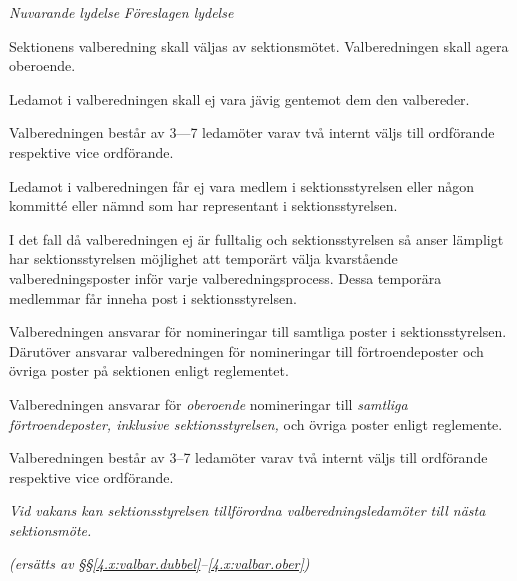\documentclass{article}
\newenvironment{lydelse}
    {\begin{paracol}{2}%
        \emph{Nuvarande lydelse}%
        \switchcolumn%
        \emph{Föreslagen lydelse}%
    \end{paracol}%
    \begin{enumerate}[label=\thesubsection.\arabic*]%
    \begin{paracol}{2}%
    }{\end{paracol}\end{enumerate}}
\begin{document}
\begin{lydelse}
  \setcounter{section}{6}
  \setcounter{subsection}{1}
  \item Sektionens valberedning skall väljas av sektionsmötet. Valberedningen skall agera oberoende.
  \item Ledamot i valberedningen skall ej vara jävig gentemot dem den valbereder.
  \setcounter{subsection}{2}
  \setcounter{enumi}{0}
  \item Valberedningen består av 3---7 ledamöter varav två internt väljs till ordförande respektive vice ordförande.
  \item Ledamot i valberedningen får ej vara medlem i sektionsstyrelsen eller någon kommitté eller nämnd som har representant i sektionsstyrelsen.
  \item I det fall då valberedningen ej är fulltalig och sektionsstyrelsen så anser lämpligt har sektionsstyrelsen möjlighet att temporärt välja kvarstående valberedningsposter inför varje valberedningsprocess. Dessa temporära medlemmar får inneha post i sektionsstyrelsen.
  \setcounter{subsection}{4}
  \setcounter{enumi}{0}  
  \item Valberedningen ansvarar för nomineringar till samtliga poster i sektionsstyrelsen. Därutöver ansvarar valberedningen för nomineringar till förtroendeposter och övriga poster på sektionen enligt reglementet.

  \switchcolumn
  \item Valberedningen ansvarar för \emph{oberoende} nomineringar till \emph{samtliga förtroendeposter, inklusive sektionsstyrelsen,} och övriga poster enligt reglemente. \label{13.x:valBfp}
  \item Valberedningen består av 3--7 ledamöter varav två internt väljs till ordförande respektive vice ordförande.
  \item \emph{Vid vakans kan sektionsstyrelsen tillförordna valberedningsledamöter till nästa sektionsmöte. }

  \item[] \emph{(ersätts av \S\S\ref{4.x:valbar.dubbel}--\ref{4.x:valbar.ober})}
\end{lydelse}
\setcounter{section}{13}
\setcounter{subsection}{0}
\end{document}
